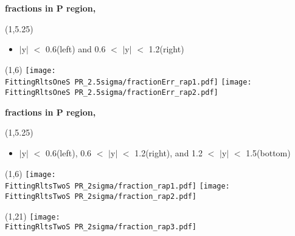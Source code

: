 \documentclass[11pt,slidescentered,red,compress,handout,hyperref={bookmarks=true},mathseriftable]{beamer}
\newcommand{\FittingRltsOneS}{../Psi1S/Fit/parameter/evaluateCtau/}
\newcommand{\FittingRltsTwoS}{../Psi2S/Fit/parameter/evaluateCtau/}
\begin{document}
\begin{frame}[t]{\small \bf fractions in P region,  }{}
\begin{textblock}{48}(1,5.25)
\begin{itemize}
\scriptsize \item  $|$y$|$ $<$ 0.6(left) and 0.6 $<$ $|$y$|$ $<$ 1.2(right)
\end{itemize}
\end{textblock}
\begin{textblock}{48}(1,6)
\hspace*{10pt} \texttt{[image: \\FittingRltsOneS PR\_2.5sigma/fractionErr\_rap1.pdf]}
\hspace*{10pt} \texttt{[image: \\FittingRltsOneS PR\_2.5sigma/fractionErr\_rap2.pdf]}
\end{textblock}
\end{frame}

\begin{frame}[t]{\small \bf fractions in P region,  }{}
\begin{textblock}{48}(1,5.25)
\begin{itemize}
\scriptsize \item  $|$y$|$ $<$ 0.6(left), 0.6 $<$ $|$y$|$ $<$ 1.2(right), and 1.2 $<$ $|$y$|$ $<$ 1.5(bottom)
\end{itemize}
\end{textblock}
\begin{textblock}{48}(1,6)
\hspace*{10pt} \texttt{[image: \\FittingRltsTwoS PR\_2sigma/fraction\_rap1.pdf]}
\hspace*{10pt} \texttt{[image: \\FittingRltsTwoS PR\_2sigma/fraction\_rap2.pdf]}
\begin{textblock}{48}(1,21)
\hspace*{10pt} \texttt{[image: \\FittingRltsTwoS PR\_2sigma/fraction\_rap3.pdf]}
\end{textblock}
\end{textblock}
\end{frame}
\end{document}
